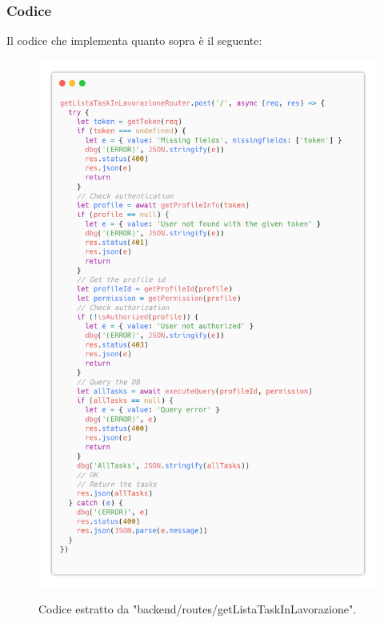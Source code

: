 \documentclass{report}
\begin{document}
\subsubsection*{Codice}

Il codice che implementa quanto sopra è il seguente:

\begin{figure}[H]
	\centering\includegraphics[width=1\textwidth]{images/code_in_lavorazione.png}

	Codice estratto da "backend/routes/getListaTaskInLavorazione".
\end{figure}
\end{document}
